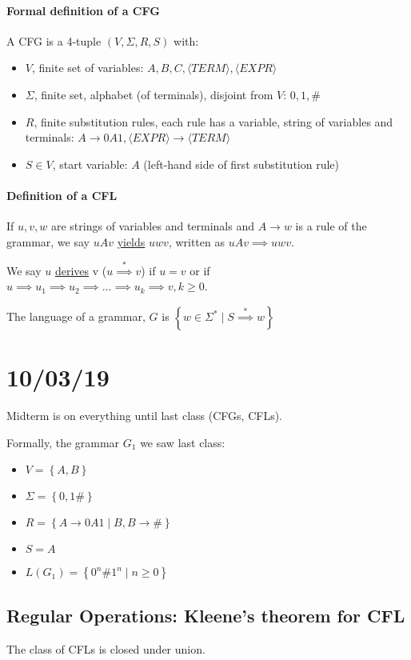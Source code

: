 \documentclass[12 pt]{article}
\begin{document}
\paragraph{Formal definition of a CFG}
A CFG is a 4-tuple $(V, \Sigma, R, S)$ with:
\begin{itemize}
\item $V$, finite set of variables: $A, B, C, \langle TERM \rangle, \langle EXPR
  \rangle$
\item $\Sigma$, finite set, alphabet (of terminals), disjoint from $V$: $0, 1, \#$
\item $R$, finite substitution rules, each rule has a variable, string
  of variables and terminals: $A \to 0A1, \langle EXPR \rangle \to \langle
  TERM \rangle$
\item $S \in V$, start variable: $A$ (left-hand side of first substitution rule)
\end{itemize}
\paragraph{Definition of a CFL}
If $u, v, w$ are strings of variables and terminals and $A \to w$ is a
rule of the grammar, we say $uAv$ \underline{yields} $uwv$, written as
$uAv \implies uwv$.

We say $u$ \underline{derives} v ($u \stackrel{*}{\implies} v$) if $u
= v$ or if $u \implies u_1 \implies u_2 \implies \ldots \implies u_k
\implies v, k \geq 0$.

The language of a grammar, $G$ is $\left\{w \in \Sigma^* \mid S
  \stackrel{*}{\implies}w\right\}$
\section{10/03/19}
Midterm is on everything until last class (CFGs, CFLs).

Formally, the grammar $G_1$ we saw last class:
\begin{itemize}
\item $V = \left\{A, B\right\}$
\item $\Sigma = \left\{0,1\#\right\}$
\item $R = \left\{A \to 0A1 \mid B, B \to \#\right\}$
\item $S = A$
\item $L(G_1) = \left\{0^n \# 1^n \mid n \geq 0\right\}$
\end{itemize}
\subsection{Regular Operations: Kleene's theorem for CFL}
The class of CFLs is closed under union.
\end{document}
